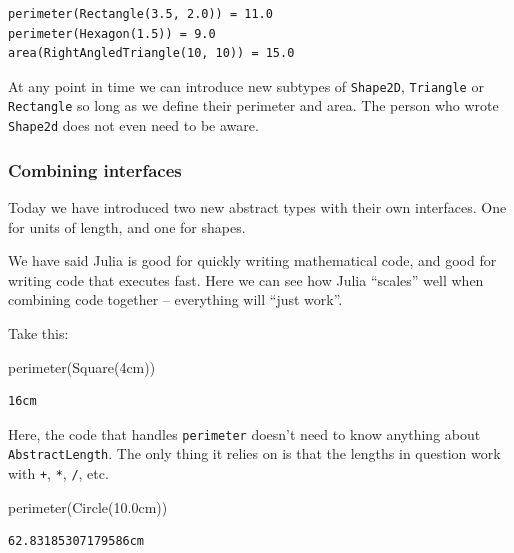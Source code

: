 \documentclass[
]{article}
\newenvironment{Shaded}{\begin{snugshade}}{\end{snugshade}}
\newcommand{\FloatTok}[1]{\textcolor[rgb]{0.68,0.00,0.00}{#1}}
\newcommand{\FunctionTok}[1]{\textcolor[rgb]{0.28,0.35,0.67}{#1}}
\newcommand{\NormalTok}[1]{\textcolor[rgb]{0.00,0.23,0.31}{#1}}
\begin{document}
\begin{verbatim}
perimeter(Rectangle(3.5, 2.0)) = 11.0
perimeter(Hexagon(1.5)) = 9.0
area(RightAngledTriangle(10, 10)) = 15.0
\end{verbatim}

At any point in time we can introduce new subtypes of \texttt{Shape2D},
\texttt{Triangle} or \texttt{Rectangle} so long as we define their
perimeter and area. The person who wrote \texttt{Shape2d} does not even
need to be aware.

\subsubsection{Combining interfaces}\label{combining-interfaces}

Today we have introduced two new abstract types with their own
interfaces. One for units of length, and one for shapes.

We have said Julia is good for quickly writing mathematical code, and
good for writing code that executes fast. Here we can see how Julia
``scales'' well when combining code together -- everything will ``just
work''.

Take this:

\begin{Shaded}
\begin{Highlighting}[]
\FunctionTok{perimeter}\NormalTok{(}\FunctionTok{Square}\NormalTok{(}\FloatTok{4}\NormalTok{cm))}
\end{Highlighting}
\end{Shaded}

\begin{verbatim}
16cm
\end{verbatim}

Here, the code that handles \texttt{perimeter} doesn't need to know
anything about \texttt{AbstractLength}. The only thing it relies on is
that the lengths in question work with \texttt{+}, \texttt{*},
\texttt{/}, etc.

\begin{Shaded}
\begin{Highlighting}[]
\FunctionTok{perimeter}\NormalTok{(}\FunctionTok{Circle}\NormalTok{(}\FloatTok{10.0}\NormalTok{cm))}
\end{Highlighting}
\end{Shaded}

\begin{verbatim}
62.83185307179586cm
\end{verbatim}
\end{document}
